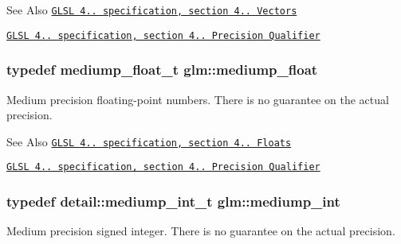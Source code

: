 \begin{DoxySeeAlso}{See Also}
\href{http://www.opengl.org/registry/doc/GLSLangSpec.4.20.8.pdf}{\tt G\-L\-S\-L 4.. specification, section 4.. Vectors} 

\href{http://www.opengl.org/registry/doc/GLSLangSpec.4.20.8.pdf}{\tt G\-L\-S\-L 4.. specification, section 4.. Precision Qualifier} 
\end{DoxySeeAlso}
\hypertarget{group__core__precision_gac785826c039fe6c97c03b37c81c1a68e}{
\subsubsection[{mediump\-\_\-float}]{\setlength{\rightskip}{0pt plus 5cm}typedef mediump\-\_\-float\-\_\-t {\bf glm\-::mediump\-\_\-float}}}\label{group__core__precision_gac785826c039fe6c97c03b37c81c1a68e}
Medium precision floating-\/point numbers. There is no guarantee on the actual precision.

\begin{DoxySeeAlso}{See Also}
\href{http://www.opengl.org/registry/doc/GLSLangSpec.4.20.8.pdf}{\tt G\-L\-S\-L 4.. specification, section 4.. Floats} 

\href{http://www.opengl.org/registry/doc/GLSLangSpec.4.20.8.pdf}{\tt G\-L\-S\-L 4.. specification, section 4.. Precision Qualifier} 
\end{DoxySeeAlso}
\hypertarget{group__core__precision_ga2a3dcbcd7f4e17663d393a12061ac6ac}{
\subsubsection[{mediump\-\_\-int}]{\setlength{\rightskip}{0pt plus 5cm}typedef detail\-::mediump\-\_\-int\-\_\-t {\bf glm\-::mediump\-\_\-int}}}\label{group__core__precision_ga2a3dcbcd7f4e17663d393a12061ac6ac}
Medium precision signed integer. There is no guarantee on the actual precision.

